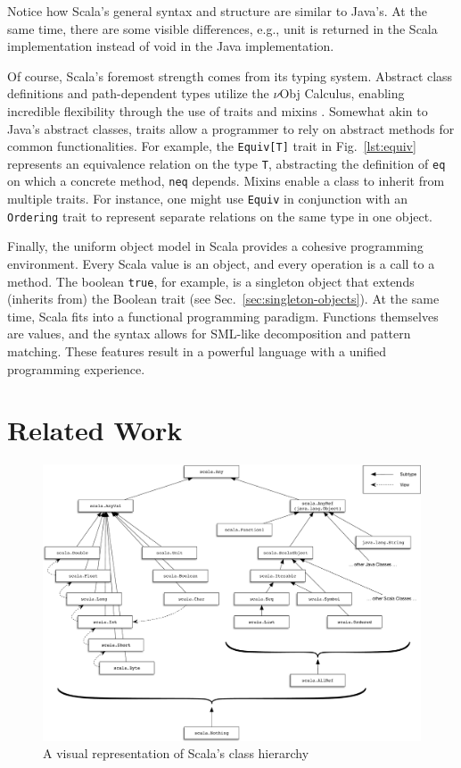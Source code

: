 \documentclass[jou,apacite]{IEEEtran}
\begin{document}
\begin{listing}
  \centering
  \inputminted{Java}{../examples/PrintExample.java}
  \inputminted{Scala}{../examples/PrintExample.scala}
  \caption{Notice how Scala's general syntax and structure are similar
    to Java's. At the same time, there are some visible differences, e.g., unit
    is returned in the Scala implementation instead of void in the Java
    implementation.}
  \label{lst:print}
\end{listing}

Of course, Scala's foremost strength comes from its typing system. Abstract
class definitions and path-dependent types utilize the $\nu$Obj Calculus,
enabling incredible flexibility through the use of traits and mixins
\cite{odersky_nominal_2003}. Somewhat akin to Java's abstract classes, traits
allow a programmer to rely on abstract methods for common functionalities. For
example, the \texttt{Equiv[T]} trait in Fig.~\ref{lst:equiv} represents an
equivalence relation on the type \texttt{T}, abstracting the definition of
\texttt{eq} on which a concrete method, \texttt{neq} depends. Mixins enable a
class to inherit from multiple traits. For instance, one might use
\texttt{Equiv} in conjunction with an \texttt{Ordering} trait to represent
separate relations on the same type in one object.

Finally, the uniform object model in Scala provides a cohesive programming
environment. Every Scala value is an object, and every operation is a call to a
method. The boolean \texttt{true}, for example, is a singleton object that
extends (inherits from) the Boolean trait (see
Sec.~\ref{sec:singleton-objects}). At the same time, Scala fits into a
functional programming paradigm. Functions themselves are values, and the syntax
allows for SML-like decomposition and pattern matching. These features result in
a powerful language with a unified programming experience.

\section{Related Work}
\label{sec:related-work}

\begin{figure}[h]
  \centering
  \includegraphics[width=0.9\linewidth]{scala_classes}
  \caption{A visual representation of Scala's class hierarchy}
  \label{fig:example}
\end{figure} 
\end{document}
